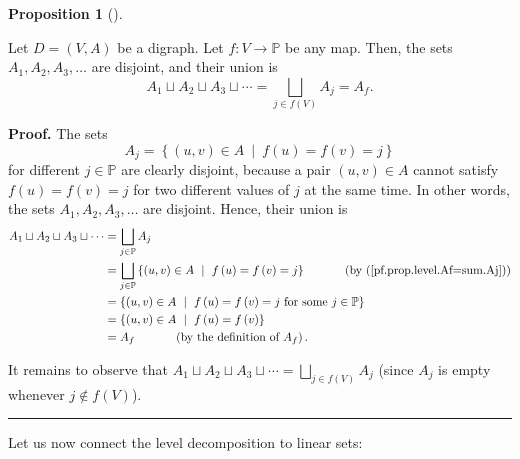 \documentclass[numbers=enddot,12pt,final,onecolumn,notitlepage]{scrartcl}%
\numberwithin{exer}{section}
\theoremstyle{definition}
\newtheorem{prop}[theo]{Proposition}
\newenvironment{proposition}[1][]
{\begin{prop}[#1]\begin{leftbar}}
{\end{leftbar}\end{prop}}
\newenvironment{proof}[1][Proof]{\noindent\textbf{#1.} }{\ \rule{0.5em}{0.5em}}
\let\sqcupnonlimits\bigsqcup
\renewcommand{\bigsqcup}{\sqcupnonlimits\limits}
\newenvironment{verlong}{}{}
\begin{document}
\begin{proposition}
\label{prop.level.Af=sum}Let $D=\left(  V,A\right)  $ be a digraph. Let
$f:V\rightarrow\mathbb{P}$ be any map. Then, the sets $A_{1},A_{2}%
,A_{3},\ldots$ are disjoint, and their union is
\[
A_{1}\sqcup A_{2}\sqcup A_{3}\sqcup\cdots=\bigsqcup_{j\in f\left(  V\right)
}A_{j}=A_{f}.
\]

\end{proposition}

\begin{verlong}


\begin{proof}
The sets%
\begin{equation}
A_{j}=\left\{  \left(  u,v\right)  \in A\ \mid\ f\left(  u\right)  =f\left(
v\right)  =j\right\}  \label{pf.prop.level.Af=sum.Aj}%
\end{equation}
for different $j\in\mathbb{P}$ are clearly disjoint, because a pair $\left(
u,v\right)  \in A$ cannot satisfy $f\left(  u\right)  =f\left(  v\right)  =j$
for two different values of $j$ at the same time. In other words, the sets
$A_{1},A_{2},A_{3},\ldots$ are disjoint. Hence, their union is%
\begin{align*}
A_{1}\sqcup A_{2}\sqcup A_{3}\sqcup\cdots &  =\bigsqcup_{j\in\mathbb{P}}%
A_{j}\\
&  =\bigsqcup_{j\in\mathbb{P}}\left\{  \left(  u,v\right)  \in A\ \mid
\ f\left(  u\right)  =f\left(  v\right)  =j\right\}
\ \ \ \ \ \ \ \ \ \ \left(  \text{by (\ref{pf.prop.level.Af=sum.Aj})}\right)
\\
&  =\left\{  \left(  u,v\right)  \in A\ \mid\ f\left(  u\right)  =f\left(
v\right)  =j\text{ for some }j\in\mathbb{P}\right\} \\
&  =\left\{  \left(  u,v\right)  \in A\ \mid\ f\left(  u\right)  =f\left(
v\right)  \right\} \\
&  =A_{f}\ \ \ \ \ \ \ \ \ \ \left(  \text{by the definition of }A_{f}\right)
.
\end{align*}


It remains to observe that $A_{1}\sqcup A_{2}\sqcup A_{3}\sqcup\cdots
=\bigsqcup_{j\in f\left(  V\right)  }A_{j}$ (since $A_{j}$ is empty whenever
$j\notin f\left(  V\right)  $).
\end{proof}
\end{verlong}

Let us now connect the level decomposition to linear sets:
\end{document}
